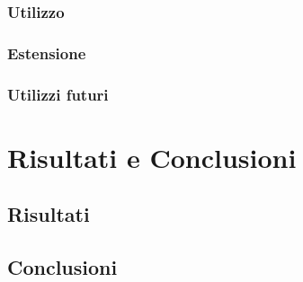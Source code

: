\documentclass[a4paper,12pt, doubleside]{report}
\begin{document}
            \subsection{Utilizzo}
            \subsection{Estensione}
            \subsection{Utilizzi futuri}
            
    \chapter{Risultati e Conclusioni}
        \section{Risultati}
        \section{Conclusioni}
\end{document}
